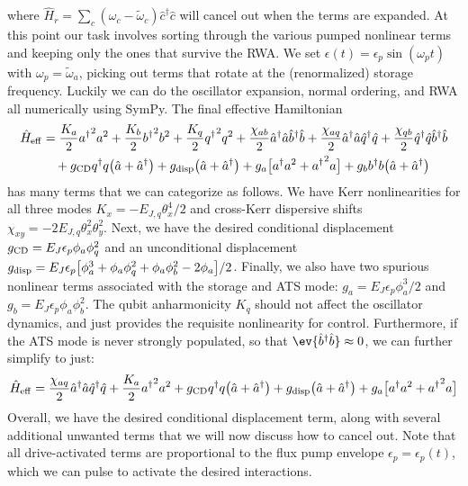 where $\hat{H}_{r} = \sum_c (\omega_c - \tilde{\omega}_c)\hat{c}^\dagger\hat{c}$ will cancel out when the terms are expanded. At this point our task involves sorting through the various pumped nonlinear terms and keeping only the ones that survive the RWA. We set $\epsilon(t) = \epsilon_p \sin(\omega_p t)$ with $\omega_p = \tilde{\omega}_a$, picking out terms that rotate at the (renormalized) storage frequency. Luckily we can do the oscillator expansion, normal ordering, and RWA all numerically using SymPy. The final effective Hamiltonian
\begin{align}
\begin{split}
\hat{H}_{\rm eff} &= \frac{K_a}{2}{{a}^\dagger}^{2} {a}^{2} + \frac{K_b}{2}{{b}^\dagger}^{2} {b}^{2} + \frac{K_q}{2}{{q}^\dagger}^{2} {q}^{2} + \frac{\chi_{ab}}{2}\hat{a}^\dagger\hat{a}\hat{b}^\dagger\hat{b} + \frac{\chi_{aq}}{2} \hat{a}^\dagger\hat{a}\hat{q}^\dagger\hat{q} + \frac{\chi_{qb}}{2} \hat{q}^\dagger\hat{q}\hat{b}^\dagger\hat{b} \\
&\quad + g_{\rm CD}{{q}^\dagger} {q}\big(\hat{a} + \hat{a}^\dagger\big) + g_{\rm disp} \big(\hat{a}+\hat{a}^\dagger\big) + g_a\big[{{a}^\dagger} {a}^{2} + {{a}^\dagger}^{2} {a}\big] + g_b {{b}^\dagger} {b}\big(\hat{a} + \hat{a}^\dagger\big) 
\end{split}
\end{align}
has many terms that we can categorize as follows. We have Kerr nonlinearities for all three modes $K_x = -E_{J, q}\theta_{x}^{4} / 2$ and cross-Kerr dispersive shifts $\chi_{xy} = -2E_{J, q}\theta_{x}^{2} \theta_{y}^{2}$. Next, we have the desired conditional displacement $g_{\rm CD} = E_J\epsilon_{p} \phi_{a} \phi_{q}^{2}$ and an unconditional displacement $g_{\rm disp} = E_J\epsilon_p\big[\phi_a^3 +\phi_{a} \phi_{q}^{2} + \phi_{a} \phi_{b}^{2} - 2\phi_a\big]/2$. Finally, we also have two spurious nonlinear terms associated with the storage and ATS mode: $g_a = E_J\epsilon_{p} \phi_{a}^{3}/2$ and $g_b = E_J\epsilon_{p} \phi_{a}\phi_{b}^{2}$. The qubit anharmonicity $K_q$ should not affect the oscillator dynamics, and just provides the requisite nonlinearity for control. Furthermore, if the ATS mode is never strongly populated, so that $\ev{\hat{b}^\dagger\hat{b}} \approx 0$, we can further simplify to just:
\begin{equation}
\hat{H}_{\rm eff} = \frac{\chi_{aq}}{2} \hat{a}^\dagger\hat{a}\hat{q}^\dagger\hat{q} + \frac{K_a}{2}{{a}^\dagger}^{2} {a}^{2} + g_{\rm CD}{{q}^\dagger} {q}\big(\hat{a} + \hat{a}^\dagger\big) + g_{\rm disp} \big(\hat{a}+\hat{a}^\dagger\big) + g_a\big[{{a}^\dagger} {a}^{2} + {{a}^\dagger}^{2} {a}\big]
\label{eq:5_FCD_full_hamiltonian}
\end{equation}
Overall, we have the desired conditional displacement term, along with several additional unwanted terms that we will now discuss how to cancel out. Note that all drive-activated terms are proportional to the flux pump envelope $\epsilon_p = \epsilon_p(t)$, which we can pulse to activate the desired interactions. 

